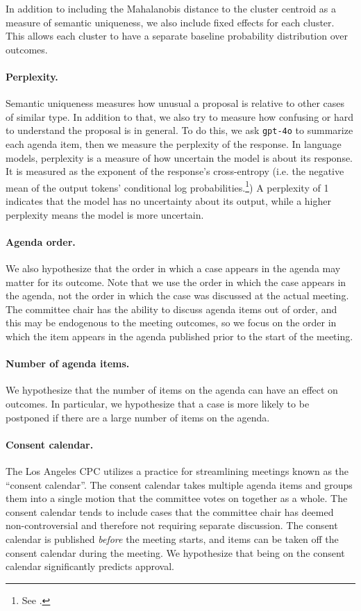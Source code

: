 In addition to including the Mahalanobis distance to the cluster centroid as a measure of semantic uniqueness, we also include fixed effects for each cluster. This allows each cluster to have a separate baseline probability distribution over outcomes.

\paragraph{Perplexity.} Semantic uniqueness measures how unusual a proposal is relative to other cases of similar type. In addition to that, we also try to measure how confusing or hard to understand the proposal is in general. To do this, we ask \texttt{gpt-4o} to summarize each agenda item, then we measure the perplexity of the response. In language models, perplexity is a measure of how uncertain the model is about its response. It is measured as the exponent of the response's cross-entropy  (i.e. the negative mean of the output tokens' conditional log probabilities.\footnote{See \citet{jm2}.}) A perplexity of 1 indicates that the model has no uncertainty about its output, while a higher perplexity means the model is more uncertain. 

\paragraph{Agenda order.} We also hypothesize that the order in which a case appears in the agenda may matter for its outcome. Note that we use the order in which the case appears in the agenda, not the order in which the case was discussed at the actual meeting. The committee chair has the ability to discuss agenda items out of order, and this may be endogenous to the meeting outcomes, so we focus on the order in which the item appears in the agenda published prior to the start of the meeting.

\paragraph{Number of agenda items.} We hypothesize that the number of items on the agenda can have an effect on outcomes. In particular, we hypothesize that a case is more likely to be postponed if there are a large number of items on the agenda.

\paragraph{Consent calendar.} The Los Angeles CPC utilizes a practice for streamlining meetings known as the ``consent calendar''. The consent calendar takes multiple agenda items and groups them into a single motion that the committee votes on together as a whole. The consent calendar tends to include cases that the committee chair has deemed non-controversial and therefore not requiring separate discussion. The consent calendar is published \emph{before} the meeting starts, and items can be taken off the consent calendar during the meeting. We hypothesize that being on the consent calendar significantly predicts approval.

